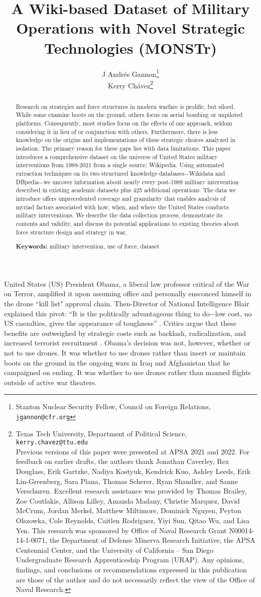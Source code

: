 \documentclass[fleqn,12pt]{article}
\title{\singlespacing A Wiki-based Dataset of Military Operations with Novel Strategic Technologies (MONSTr)}
\author{J Andr\'{e}s Gannon{\thanks{Stanton Nuclear Security Fellow, Council on Foreign Relations, \texttt{jgannon@cfr.org}}} \\ Kerry Ch\'{a}vez{\thanks{Texas Tech University, Department of Political Science, \texttt{kerry.chavez@ttu.edu} \\
Previous versions of this paper were presented at APSA 2021 and 2022. For feedback on earlier drafts, the authors thank Jonathan Caverley, Rex Douglass, Erik Gartzke, Nadiya Kostyuk, Kendrick Kuo, Ashley Leeds, Erik Lin-Greenberg, Sara Plana, Thomas Scherer, Ryan Shandler, and Sanne Verschuren. Excellent research assistance was provided by Thomas Brailey, Zoe Coutlakis, Allison Lilley, Amanda Madany, Christie Marquez, David McCrum, Jordan Merkel, Matthew Miltimore, Dominick Nguyen, Peyton Olszowka, Cole Reynolds, Caitlen Rodriguez, Yiyi Sun, Qitao Wu, and Lisa Yen. This research was sponsored by Office of Naval Research Grant N00014-14-1-0071, the Department of Defense Minerva Research Initiative, the APSA Centennial Center, and the University of California -- San Diego Undergraduate Research Apprenticeship Program (URAP). Any opinions, findings, and conclusions or recommendations expressed in this publication are those of the author and do not necessarily reflect the view of the Office of Naval Research.}}}
\date{}
\begin{document}
	\maketitle
	\thispagestyle{empty}
	\setcounter{page}{0}
	
	\begin{abstract}
		\singlespacing \noindent Research on strategies and force structures in modern warfare is prolific, but siloed. While some examine boots on the ground, others focus on aerial bombing or unpiloted platforms. Consequently, most studies focus on the effects of one approach, seldom considering it in lieu of or conjunction with others. Furthermore, there is less knowledge on the origins and implementations of these strategic choices analyzed in isolation. The primary reason for these gaps lies with data limitations. This paper introduces a comprehensive dataset on the universe of United States military interventions from 1989-2021 from a single source: Wikipedia. Using automated extraction techniques on its two structured knowledge databases$-$Wikidata and DBpedia$-$we uncover information about nearly every post-1989 military intervention described in existing academic datasets plus 425 additional operations. The data we introduce offers unprecedented coverage and granularity that enables analysis of myriad factors associated with how, when, and where the United States conducts military interventions. We describe the data collection process, demonstrate its contents and validity, and discuss its potential applications to existing theories about force structure design and strategy in war.\\
		\vspace{.1in}
		
		\noindent
		\textbf{Keywords:} military intervention, use of force, dataset
	\end{abstract}
	
\newpage
\noindent

United States (US) President Obama, a liberal law professor critical of the War on Terror, amplified it upon assuming office and personally ensconced himself in the drone ``kill list" approval chain. Then-Director of National Intelligence Blair explained this pivot: ``It is the politically advantageous thing to do$-$low cost, no US casualties, gives the appearance of toughness” \citep{BeckerShane12}. Critics argue that these benefits are outweighed by strategic costs such as backlash, radicalization, and increased terrorist recruitment \citep{KilcullenExum09}. Obama's decision was not, however, whether or not to use drones. It was whether to use drones rather than insert or maintain boots on the ground in the ongoing wars in Iraq and Afghanistan that he campaigned on ending. It was whether to use drones rather than manned flights outside of active war theaters. 
	
\end{document}
